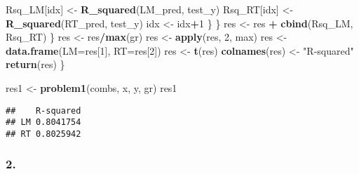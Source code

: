 \documentclass[
]{article}
\newenvironment{Shaded}{\begin{snugshade}}{\end{snugshade}}
\newcommand{\AttributeTok}[1]{\textcolor[rgb]{0.13,0.29,0.53}{#1}}
\newcommand{\DecValTok}[1]{\textcolor[rgb]{0.00,0.00,0.81}{#1}}
\newcommand{\FunctionTok}[1]{\textcolor[rgb]{0.13,0.29,0.53}{\textbf{#1}}}
\newcommand{\NormalTok}[1]{#1}
\newcommand{\OtherTok}[1]{\textcolor[rgb]{0.56,0.35,0.01}{#1}}
\newcommand{\SpecialCharTok}[1]{\textcolor[rgb]{0.81,0.36,0.00}{\textbf{#1}}}
\newcommand{\StringTok}[1]{\textcolor[rgb]{0.31,0.60,0.02}{#1}}
\begin{document}
\begin{Shaded}
\begin{Highlighting}[]
\NormalTok{        Rsq\_LM[idx] }\OtherTok{\textless{}{-}} \FunctionTok{R\_squared}\NormalTok{(LM\_pred, test\_y)}
\NormalTok{        Rsq\_RT[idx] }\OtherTok{\textless{}{-}} \FunctionTok{R\_squared}\NormalTok{(RT\_pred, test\_y)}
\NormalTok{        idx }\OtherTok{\textless{}{-}}\NormalTok{ idx}\SpecialCharTok{+}\DecValTok{1}
\NormalTok{      \}}
\NormalTok{    \}}
\NormalTok{    res }\OtherTok{\textless{}{-}}\NormalTok{ res }\SpecialCharTok{+} \FunctionTok{cbind}\NormalTok{(Rsq\_LM, Rsq\_RT)}
\NormalTok{  \}}
\NormalTok{  res }\OtherTok{\textless{}{-}}\NormalTok{ res}\SpecialCharTok{/}\FunctionTok{max}\NormalTok{(gr)}
\NormalTok{  res }\OtherTok{\textless{}{-}} \FunctionTok{apply}\NormalTok{(res, }\DecValTok{2}\NormalTok{, max)}
\NormalTok{  res }\OtherTok{\textless{}{-}} \FunctionTok{data.frame}\NormalTok{(}\AttributeTok{LM=}\NormalTok{res[}\DecValTok{1}\NormalTok{], }\AttributeTok{RT=}\NormalTok{res[}\DecValTok{2}\NormalTok{])}
\NormalTok{  res }\OtherTok{\textless{}{-}} \FunctionTok{t}\NormalTok{(res)}
  \FunctionTok{colnames}\NormalTok{(res) }\OtherTok{\textless{}{-}} \StringTok{"R{-}squared"}
  \FunctionTok{return}\NormalTok{(res)}
\NormalTok{\}}

\NormalTok{res1 }\OtherTok{\textless{}{-}} \FunctionTok{problem1}\NormalTok{(combs, x, y, gr)}
\NormalTok{res1}
\end{Highlighting}
\end{Shaded}

\begin{verbatim}
##    R-squared
## LM 0.8041754
## RT 0.8025942
\end{verbatim}

\subsubsection{2.}\label{section-1}
\end{document}
